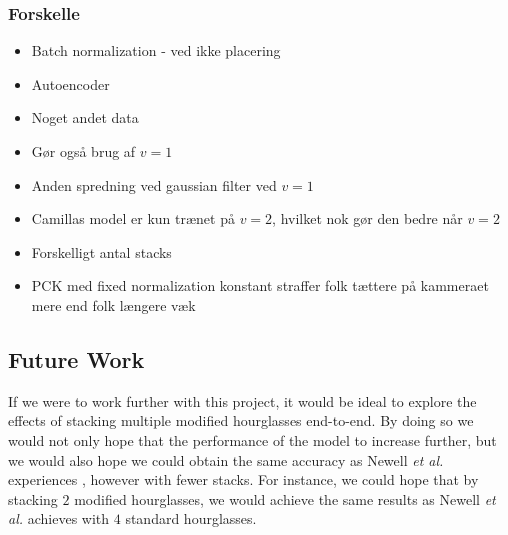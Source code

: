 \documentclass[./main.tex]{subfiles}
\begin{document}
\subsubsection{Forskelle}
\begin{itemize}
    \item Batch normalization - ved ikke placering 
    \item Autoencoder
    \item Noget andet data
    \item Gør også brug af $v = 1$
    \item Anden spredning ved gaussian filter ved $v = 1$
    \item Camillas model er kun trænet på $v = 2$, hvilket nok gør den bedre når $v = 2$
    \item Forskelligt antal stacks
    \item PCK med fixed normalization konstant straffer folk tættere på kammeraet mere end folk længere væk
\end{itemize}

\subsection{Future Work}
If we were to work further with this project, it would be ideal to explore the effects of stacking multiple modified hourglasses end-to-end. By doing so we would not only hope that the performance of the model to increase further, but we would also hope we could obtain the same accuracy as Newell \textit{et al.} experiences \cite{Newell}, however with fewer stacks. For instance, we could hope that by stacking $2$ modified hourglasses, we would achieve the same results as Newell \textit{et al.} achieves with $4$ standard hourglasses.
\end{document}
